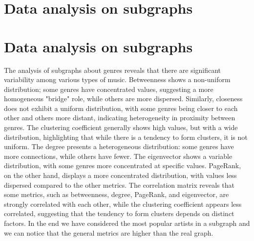 \section{Data analysis on subgraphs}
\section{Data analysis on subgraphs}
The analysis of subgraphs about genres reveals that there are significant variability among various types of music. 
Betweenness shows a non-uniform distribution; some genres have concentrated values, suggesting a more homogeneous "bridge" role, while others are more dispersed. 
Similarly, closeness does not exhibit a uniform distribution, with some genres being closer to each other and others more distant, indicating heterogeneity in proximity between genres. 
The clustering coefficient generally shows high values, but with a wide distribution, highlighting that while there is a tendency to form clusters, it is not uniform. The degree presents a heterogeneous distribution: some genres have more connections, while others have fewer. 
The eigenvector shows a variable distribution, with some genres more concentrated at specific values. PageRank, on the other hand, displays a more concentrated distribution, with values less dispersed compared to the other metrics. 
The correlation matrix reveals that some metrics, such as betweenness, degree, PageRank, and eigenvector, are strongly correlated with each other, while the clustering coefficient appears less correlated, suggesting that the tendency to form clusters depends on distinct factors.
In the end we have considered the most popular artists in a subgraph and we can notice that the general metrics are higher than the real graph.
